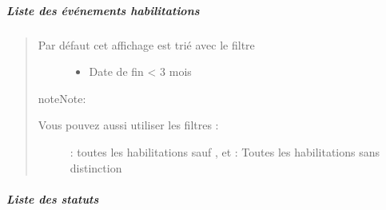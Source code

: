 \documentclass[letterpaper,10pt,english]{sphinxmanual}
\begin{document}
\subparagraph{Liste des événements habilitations}
\label{\detokenize{fonctionnalitees/habilitation_formation:liste-des-evenements-habilitations}}\begin{quote}

\noindent{}
\begin{description}
\item[{Par défaut cet affichage est trié avec le filtre}] \leavevmode{[}\sphinxcode{\sphinxupquote{\_Habilitations qui vont être perdues}}{]}\begin{itemize}
\item {} 
Date de fin \textless{} 3 mois

\end{itemize}

\end{description}

\begin{sphinxadmonition}{note}{Note:}\begin{description}
\item[{Vous pouvez aussi utiliser les filtres :}] \leavevmode
{} : toutes les habilitations sauf ,  et 
 : Toutes les habilitations sans distinction

\end{description}
\end{sphinxadmonition}
\end{quote}


\subparagraph{Liste des statuts}
\label{\detokenize{fonctionnalitees/habilitation_formation:liste-des-statuts}}\begin{quote}

\noindent{}
\end{quote}
\end{document}
